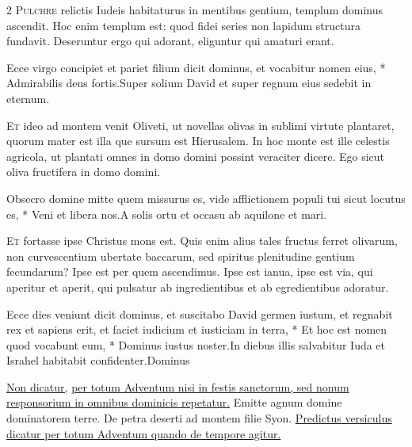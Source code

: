 \begin{multicols*}{2}
\lettrine[lines=2]{\zallmancaps \color{Red} P}{ulchre} relictis Iudeis habitaturus in mentibus gentium, templum dominus ascendit. Hoc enim templum est: quod fidei series non lapidum structura fundavit. Deseruntur ergo qui adorant, eliguntur qui amaturi erant.
\begin{responsory}
{Ecce virgo concipiet et pariet filium dicit dominus, et vocabitur nomen eius, * Admirabilis deus fortis.}{Super solium David et super regnum eius sedebit in eternum.}
\end{responsory}%
\lettrine[lines=2]{\zallmancaps \color{Blue} E}{t} ideo ad montem venit Oliveti, ut novellas olivas in sublimi virtute plantaret, quorum mater est illa que sursum est Hierusalem. In hoc monte est ille celestis agricola, ut plantati omnes in domo domini possint veraciter dicere. Ego sicut oliva fructifera in domo domini.
\begin{responsory}
{Obsecro domine mitte quem missurus es, vide afflictionem populi tui sicut locutus es, * Veni et libera nos.}{A solis ortu et occasu ab aquilone et mari.}
\end{responsory}%
\lettrine[lines=2]{\zallmancaps \color{Red} E}{t} fortasse ipse Christus mons est. Quis enim alius tales fructus ferret olivarum, non curvescentium ubertate baccarum, sed spiritus plenitudine gentium fecundarum? Ipse est per quem ascendimus. Ipse est ianua, ipse est via, qui aperitur et aperit, qui pulsatur ab ingredientibus et ab egredientibus adoratur.
\begin{responsory-final}
{Ecce dies veniunt dicit dominus, et suscitabo David germen iustum, et regnabit rex et sapiens erit, et faciet iudicium et iusticiam in terra, * Et hoc est nomen quod vocabunt eum, * Dominus iustus noster.}{In diebus illis salvabitur Iuda et Israhel habitabit confidenter.}{Dominus}
\end{responsory-final}%
\newline \ul{Non dicatur,}  \ul{per totum Adventum nisi in festis sanctorum, sed nonum responsorium in omnibus dominicis repetatur.}
\newline \V Emitte agnum domine dominatorem terre.
\newline \R De petra deserti ad montem filie Syon.
\newline \ul{Predictus versiculus dicatur per totum Adventum quando de tempore agitur.}

\end{multicols*}
